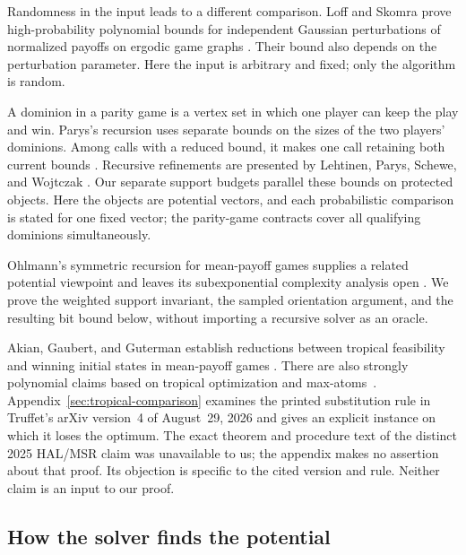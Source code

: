 Randomness in the input leads to a different comparison. Loff and
Skomra prove high-probability polynomial bounds for independent Gaussian
perturbations of normalized payoffs on ergodic game graphs
\cite[Theorem~1]{LoffSkomra2024}. Their bound also depends on the
perturbation parameter. Here the input is arbitrary and fixed; only
the algorithm is random.

A dominion in a parity game is a vertex set in which one player can
keep the play and win. Parys's recursion uses separate bounds on the
sizes of the two players' dominions. Among calls with a reduced bound, it makes one call
retaining both current bounds
\cite[Algorithm~2 and Section~5]{Parys2019}. Recursive refinements
are presented by Lehtinen, Parys, Schewe, and Wojtczak
\cite[Sections~3--4]{LehtinenParysScheweWojtczak2022}. Our separate
support budgets parallel these bounds on protected objects. Here the
objects are potential vectors, and each probabilistic comparison is
stated for one fixed vector; the parity-game contracts cover all
qualifying dominions simultaneously.

Ohlmann's symmetric recursion for mean-payoff games supplies a related
potential viewpoint and leaves its subexponential complexity analysis
open \cite[Sections~3--5 and~7]{Ohlmann2026}. We prove the weighted
support invariant, the sampled orientation argument, and the resulting
bit bound below, without importing a recursive solver as an oracle.

Akian, Gaubert, and Guterman establish reductions between tropical
feasibility and winning initial states in mean-payoff games
\cite[Theorem~3.2 and Corollary~3.7]{AkianGaubertGuterman2012}.
There are also strongly polynomial claims based on tropical optimization
and max-atoms~\cite{Truffet2025MaxAtoms,Truffet2026SubstitutionV4}.
Appendix~\ref{sec:tropical-comparison} examines the printed substitution
rule in Truffet's arXiv version~4 of August~29, 2026 and gives an explicit
instance on which it loses the optimum. The exact theorem and procedure
text of the distinct 2025 HAL/MSR claim was unavailable to us; the
appendix makes no assertion about that proof. Its objection is specific
to the cited version and rule. Neither claim is an input to our proof.

\subsection{How the solver finds the potential}


